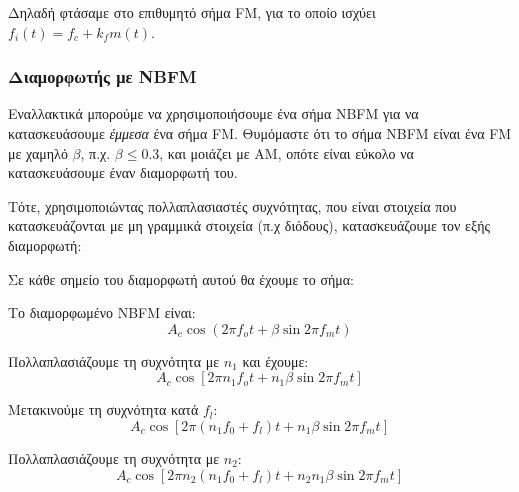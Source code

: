 \documentclass[11pt,a4paper,notitlepage,fleqn,final]{article}
\begin{document}
Δηλαδή φτάσαμε στο επιθυμητό σήμα FM, για το οποίο ισχύει \( f_i(t) = f_c + k_f m(t) \).

\subsubsection{Διαμορφωτής με NBFM}
Εναλλακτικά μπορούμε να χρησιμοποιήσουμε ένα σήμα NBFM για να κατασκευάσουμε \textit{έμμεσα} ένα σήμα
FM. Θυμόμαστε ότι το σήμα NBFM είναι ένα FM με χαμηλό \( β \), π.χ. \( β \leq 0.3 \), και
μοιάζει με AM, οπότε είναι εύκολο να κατασκευάσουμε έναν διαμορφωτή του.

Τότε, χρησιμοποιώντας πολλαπλασιαστές συχνότητας, που είναι στοιχεία που κατασκευάζονται
με μη γραμμικά στοιχεία (π.χ διόδους), κατασκευάζουμε τον εξής διαμορφωτή:


Σε κάθε σημείο του διαμορφωτή αυτού θα έχουμε το σήμα:
\begin{enumpar}
	\item Το διαμορφωμένο NBFM είναι: \[ A_c \cos\left( 2πf_o t + β\sin 2πf_m t \right) \]
	\item Πολλαπλασιάζουμε τη συχνότητα με \( n_1 \) και έχουμε:
	\[
	A_c\cos \left[ 2π n_1 f_o t + n_1 β \sin 2πf_m t \right]
	\]
	\item Μετακινούμε τη συχνότητα κατά \( f_l \):
	\[
	A_c\cos \left[ 2π (n_1 f_0 + f_l) t + n_1 β \sin 2π f_m t \right]
	\]
	\item Πολλαπλασιάζουμε τη συχνότητα με \( n_2 \):
	\[
	A_c\cos \left[ 2π n_2(n_1 f_0 + f_l ) t + n_2 n_1 β \sin 2πf_m t \right]
	\]
\end{enumpar}
\end{document}
